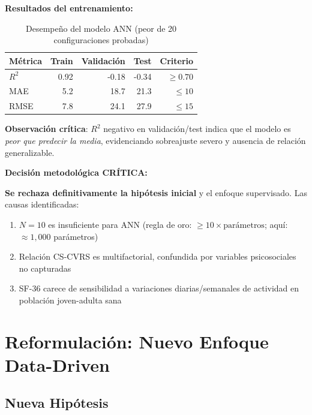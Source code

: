 \documentclass[12pt,letterpaper,twoside]{report}
\begin{document}
\begin{calculobox}
\textbf{Resultados del entrenamiento:}

\begin{table}[H]
\centering
\begin{tabular}{@{}lrrrr@{}}
\toprule
\textbf{Métrica} & \textbf{Train} & \textbf{Validación} & \textbf{Test} & \textbf{Criterio} \\
\midrule
$R^2$            & 0.92  & -0.18 & -0.34 & $\geq 0.70$ \\
MAE              & 5.2   & 18.7  & 21.3  & $\leq 10$ \\
RMSE             & 7.8   & 24.1  & 27.9  & $\leq 15$ \\
\bottomrule
\end{tabular}
\caption{Desempeño del modelo ANN (peor de 20 configuraciones probadas)}
\label{tab:ann_results}
\end{table}

\textbf{Observación crítica}: $R^2$ negativo en validación/test indica que el modelo es \textit{peor que predecir la media}, evidenciando sobreajuste severo y ausencia de relación generalizable.
\end{calculobox}

\begin{decisionbox}
\textbf{Decisión metodológica CRÍTICA:}

\textbf{Se rechaza definitivamente la hipótesis inicial} y el enfoque supervisado. Las causas identificadas:
\begin{enumerate}[noitemsep]
    \item $N=10$ es insuficiente para ANN (regla de oro: $\geq 10 \times \text{parámetros}$; aquí: $\approx 1,000$ parámetros)
    \item Relación CS-CVRS es multifactorial, confundida por variables psicosociales no capturadas
    \item SF-36 carece de sensibilidad a variaciones diarias/semanales de actividad en población joven-adulta sana
\end{enumerate}
\end{decisionbox}

\section{Reformulación: Nuevo Enfoque Data-Driven}

\subsection{Nueva Hipótesis}
\end{document}
